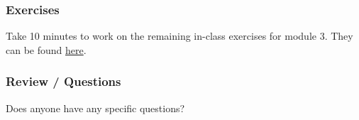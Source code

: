 \documentclass{beamer}
\begin{document}
\begin{frame}
    \frametitle{Exercises}
    Take 10 minutes to work on the remaining in-class exercises for module 3.
    They can be found \href{https://github.com/rnitulescu/RcourseOncology2021/blob/master/exercises3.R}{here}.
\end{frame}


\begin{frame}
    \frametitle{Review / Questions}
    \vfill
    Does anyone have any specific questions?
    \vfill
\end{frame}


\end{document}
